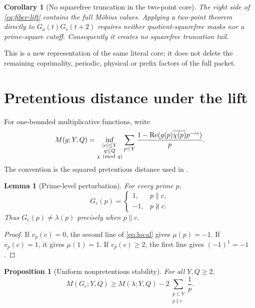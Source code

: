 \documentclass[11pt]{article}
\newtheorem{proposition}[theorem]{Proposition}
\newtheorem{corollary}[theorem]{Corollary}
\newtheorem{lemma}[theorem]{Lemma}
\theoremstyle{definition}
\theoremstyle{remark}
\begin{document}
\begin{corollary}[No squarefree truncation in the two-point core]
\label{cor:no-tail}
The right side of \eqref{eq:fiber-lift} contains the full M\"obius
values.  Applying a two-point theorem directly to \(G_a(t)G_s(t+2)\)
requires neither quotient-squarefree masks nor a prime-square cutoff.
Consequently it creates no squarefree truncation tail.
\end{corollary}

This is a new representation of the same literal core; it does not
delete the remaining coprimality, periodic, physical or prefix
factors of the full packet.

\section{Pretentious distance under the lift}

For one-bounded multiplicative functions, write
\[
 M(g;Y,Q)
 =
 \inf_{\substack{|v|\le Y\\q\le Q\\\chi\ ({\rm mod}\ q)}}
 \sum_{p\le Y}
 \frac{1-\operatorname{Re}(g(p)\overline{\chi(p)}p^{-iv})}{p}.
\]
The convention is the squared pretentious distance used in
\citet{TaoTeravainen2026}.

\begin{lemma}[Prime-level perturbation]
\label{lem:prime}
For every prime \(p\),
\[
 G_c(p)=
 \begin{cases}
  1,&p\parallel c,\\
  -1,&p\nparallel c.
 \end{cases}
\]
Thus \(G_c(p)\ne\lambda(p)\) precisely when \(p\parallel c\).
\end{lemma}

\begin{proof}
If \(v_p(c)=0\), the second line of \eqref{eq:local} gives
\(\mu(p)=-1\).  If \(v_p(c)=1\), it gives \(\mu(1)=1\).
If \(v_p(c)\ge2\), the first line gives \((-1)^1=-1\).
\end{proof}

\begin{proposition}[Uniform nonpretentious stability]
\label{prop:distance}
For all \(Y,Q\ge2\),
\begin{equation}
 \boxed{
 M(G_c;Y,Q)
 \ge M(\lambda;Y,Q)
 -2\sum_{\substack{p\le Y\\p\parallel c}}\frac1p.}
\label{eq:distance}
\end{equation}
\end{proposition}
\end{document}
